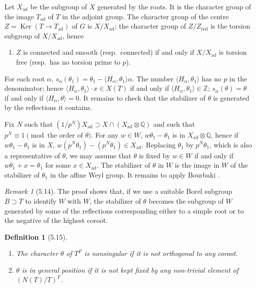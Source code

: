 \documentclass[11pt]{amsart}
\theoremstyle{plain}
\newtheorem{definition}[theorem]{Definition}
\theoremstyle{remark}
\newtheorem{remark}[theorem]{Remark}
\DeclareMathOperator{\Ker}{Ker}
\DeclareMathOperator{\ad}{ad}
\DeclareMathOperator{\red}{red}
\begin{document}
Let $X_{\ad}$ be the subgroup of $X$ generated by the roots. It is the character group of the image $T_{\ad}$ of $T$ in the adjoint group. The character group of the centre $Z = \Ker(T \to T_{\ad})$ of $G$ is $X/X_{\ad}$; the character group of $Z/Z_{\red}$ is the torsion subgroup of $X/X_{\ad}$, hence
\begin{enumerate}
\item[(c)] $Z$ is connected and smooth (resp.\ connected) if and only if $X/X_{\ad}$ is torsion free (resp.\ has no torsion prime to $p$).
\end{enumerate}

For each root $\alpha$, $s_\alpha(\theta_1) = \theta_1 - \langle H_\alpha, \theta_1 \rangle \alpha$. The number $\langle H_\alpha, \theta_1 \rangle$ has no $p$ in the denominator; hence $\langle H_\alpha, \theta_1 \rangle \cdot x \in X(T)$ if and only if $\langle H_\alpha, \theta_1 \rangle \in \mathbb{Z}$; $s_\alpha(\theta) = \theta$ if and only if $\langle H_\alpha, \theta \rangle = 0$. It remains to check that the stabilizer of $\theta$ is generated by the reflections it contains.

Fix $N$ such that $(1/p^N)X_{\ad} \supset X \cap (X_{\ad} \otimes \mathbb{Q})$ and such that $p^N \equiv 1 \pmod{\text{the order of }\theta}$. For any $w \in W$, $w\theta_1 - \theta_1$ is in $X_{\ad} \otimes \mathbb{Q}$, hence if $w\theta_1 - \theta_1$ is in $X$, $w(p^N\theta_1) - (p^N\theta_1) \in X_{\ad}$. Replacing $\theta_1$ by $p^N\theta_1$, which is also a representative of $\theta$, we may assume that $\theta$ is fixed by $w \in W$ if and only if $w\theta_1 + x = \theta_1$ for some $x \in X_{\ad}$. The stabilizer of $\theta$ in $W$ is the image in $W$ of the stabilizer of $\theta_1$ in the affine Weyl group. It remains to apply Bourbaki \cite[Ch.\ VI, Ex.\ 1 of \S 2]{Bou}.

\begin{remark}[5.14]
The proof shows that, if we use a suitable Borel subgroup $B \supset T$ to identify $W$ with $W$, the stabilizer of $\theta$ becomes the subgroup of $W$ generated by some of the reflections corresponding either to a simple root or to the negative of the highest coroot.
\end{remark}

\begin{definition}[5.15]
\begin{enumerate}
\item[(i)] The character $\theta$ of $T^F$ is \textit{nonsingular} if it is not orthogonal to any coroot.
\item[(ii)] $\theta$ is \textit{in general position} if it is not kept fixed by any non-trivial element of $(N(T)/T)^F$.
\end{enumerate}
\end{definition}
\end{document}
